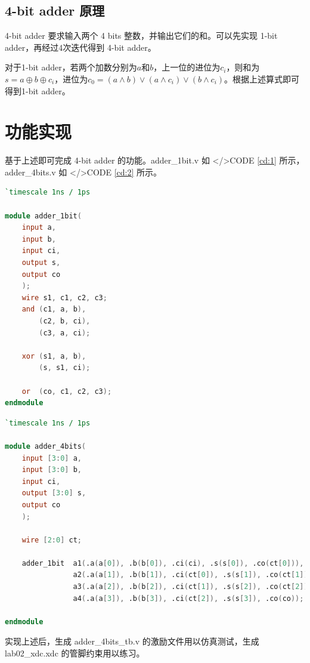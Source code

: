 \documentclass{progartcn}
\begin{document}
\subsection{4-bit adder 原理}

4-bit adder 要求输入两个 4 bits 整数，并输出它们的和。可以先实现 1-bit adder，再经过4次迭代得到 4-bit adder。

对于1-bit adder，若两个加数分别为$a$和$b$，上一位的进位为$c_i$，则和为$s=a\oplus b\oplus c_i$，进位为$c_0=(a\wedge b)\vee (a\wedge c_i)\vee (b\wedge c_i)$。根据上述算式即可得到1-bit adder。


\section{功能实现}

基于上述即可完成 4-bit adder 的功能。adder\_1bit.v 如 </>CODE \ref{cd:1} 所示，adder\_4bits.v 如 </>CODE \ref{cd:2} 所示。

\begin{lstlisting}[language=verilog,caption={adder\_1bit.v},label={cd:1}]
`timescale 1ns / 1ps

module adder_1bit(
    input a,
    input b,
    input ci,
    output s,
    output co
    );
    wire s1, c1, c2, c3;
    and (c1, a, b),
        (c2, b, ci),
        (c3, a, ci);
        
    xor (s1, a, b),
        (s, s1, ci);
        
    or  (co, c1, c2, c3);
endmodule
\end{lstlisting}

\begin{lstlisting}[language=verilog,caption={adder\_4bits.v},label={cd:2}]
`timescale 1ns / 1ps

module adder_4bits(
    input [3:0] a,
    input [3:0] b,
    input ci,
    output [3:0] s,
    output co
    );
    
    wire [2:0] ct;
    
    adder_1bit  a1(.a(a[0]), .b(b[0]), .ci(ci), .s(s[0]), .co(ct[0])),
                a2(.a(a[1]), .b(b[1]), .ci(ct[0]), .s(s[1]), .co(ct[1])),
                a3(.a(a[2]), .b(b[2]), .ci(ct[1]), .s(s[2]), .co(ct[2])),
                a4(.a(a[3]), .b(b[3]), .ci(ct[2]), .s(s[3]), .co(co));
                
endmodule
\end{lstlisting}

实现上述后，生成 adder\_4bits\_tb.v 的激励文件用以仿真测试，生成 lab02\_xdc.xdc 的管脚约束用以练习。
\end{document}
